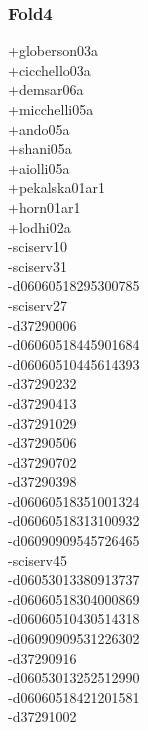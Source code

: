 \begin{multicols}{3}
\subsubsection*{Fold4}
+globerson03a\\
+cicchello03a\\
+demsar06a\\
+micchelli05a\\
+ando05a\\
+shani05a\\
+aiolli05a\\
+pekalska01ar1\\
+horn01ar1\\
+lodhi02a\\
-sciserv10\\
-sciserv31\\
-d06060518295300785\\
-sciserv27\\
-d37290006\\
-d06060518445901684\\
-d06060510445614393\\
-d37290232\\
-d37290413\\
-d37291029\\
-d37290506\\
-d37290702\\
-d37290398\\
-d06060518351001324\\
-d06060518313100932\\
-d06090909545726465\\
-sciserv45\\
-d06053013380913737\\
-d06060518304000869\\
-d06060510430514318\\
-d06090909531226302\\
-d37290916\\
-d06053013252512990\\
-d06060518421201581\\
-d37291002\\

\end{multicols}
